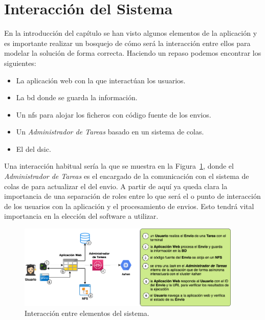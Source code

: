 \documentclass[11pt,spanish,listoffigures,listoftables]{tfgetsinf}
\begin{document}
\section{Interacción del Sistema}

En la introducción del capítulo se han visto algunos elementos de la aplicación y es importante realizar un bosquejo de cómo será la interacción entre ellos para modelar la solución de forma correcta. Haciendo un repaso podemos encontrar los siguientes:

\begin{itemize}
	\item La aplicación web con la que interactúan los usuarios.
	\item La \acrfull{bd} donde se guarda la información.
	\item Un \acrfull{nfs} para alojar los ficheros con código fuente de los \gls{envio}s.
	\item Un \textit{Administrador de Tareas} basado en un sistema de colas.
	\item El  \kahan del \acrshort{dsic}.
\end{itemize} 

Una interacción habitual sería la que se muestra en la Figura~\ref{figura:modelado-interaccion}, donde el \textit{Administrador de Tareas} es el encargado de la comunicación con el sistema de colas de \kahan para actualizar el  del \gls{envio}. A partir de aquí ya queda clara la importancia de una separación de roles entre lo que será el  o punto de interacción de los usuarios con la aplicación y el procesamiento de \gls{envio}s. Esto tendrá vital importancia en la elección del software a utilizar.

\begin{figure}[!ht]
	\centering
	\includegraphics[width=0.95\textwidth]{img/modelado-interaccion}
    \caption[Modelado Interacción entre elementos del sistema]{Interacción entre elementos del sistema.}
	\label{figura:modelado-interaccion}
\end{figure}
\end{document}
